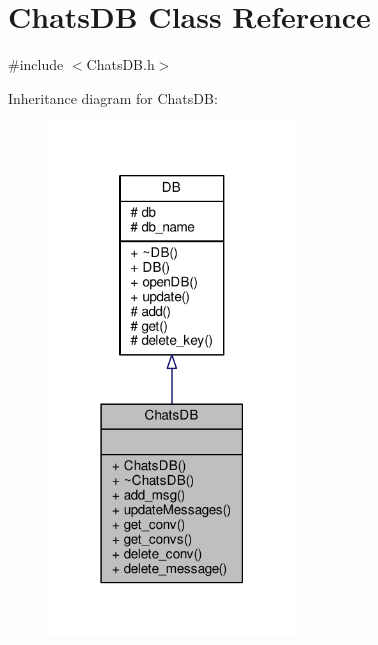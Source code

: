 \hypertarget{classChatsDB}{}\section{Chats\+DB Class Reference}
\label{classChatsDB}


{\ttfamily \#include $<$Chats\+D\+B.\+h$>$}



Inheritance diagram for Chats\+DB\+:\nopagebreak
\begin{figure}[H]
\begin{center}
\leavevmode
\includegraphics[width=186pt]{d1/db9/classChatsDB__inherit__graph}
\end{center}
\end{figure}



